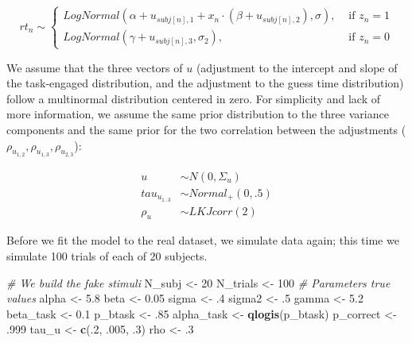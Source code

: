 \documentclass[12pt,]{krantz}
\newenvironment{Shaded}{\begin{snugshade}}{\end{snugshade}}
\newcommand{\CommentTok}[1]{\textcolor[rgb]{0.56,0.35,0.01}{\textit{#1}}}
\newcommand{\DecValTok}[1]{\textcolor[rgb]{0.00,0.00,0.81}{#1}}
\newcommand{\FloatTok}[1]{\textcolor[rgb]{0.00,0.00,0.81}{#1}}
\newcommand{\KeywordTok}[1]{\textcolor[rgb]{0.13,0.29,0.53}{\textbf{#1}}}
\newcommand{\NormalTok}[1]{#1}
\newcommand{\StringTok}[1]{\textcolor[rgb]{0.31,0.60,0.02}{#1}}
\theoremstyle{definition}
\theoremstyle{definition}
\theoremstyle{definition}
\theoremstyle{remark}
\begin{document}
\begin{equation}
rt_n \sim 
\begin{cases}
LogNormal(\alpha + u_{subj[n],1} +  x_n \cdot  (\beta +  u_{subj[n], 2}), \sigma), & \text{ if } z_n =1 \\
LogNormal(\gamma + u_{subj[n], 3}, \sigma_2), & \text{ if } z_n=0
\end{cases}
\end{equation}

We assume that the three vectors of \(u\) (adjustment to the intercept and slope of the task-engaged distribution, and the adjustment to the guess time distribution) follow a multinormal distribution centered in zero. For simplicity and lack of more information, we assume the same prior distribution to the three variance components and the same prior for the two correlation between the adjustments (\(\rho_{u_{1,2}}, \rho_{u_{1,3}}, \rho_{u_{2,3}}\)):

\begin{equation}
\begin{aligned}
u &\sim N(0, \Sigma_u)\\
tau_{u_{1..3}} & \sim  Normal_+(0, .5)\\
\rho_u &\sim LKJcorr(2) 
\end{aligned}
\end{equation}

Before we fit the model to the real dataset, we simulate data again; this time we simulate 100 trials of each of 20 subjects.

\begin{Shaded}
\begin{Highlighting}[]
\CommentTok{# We build the fake stimuli}
\NormalTok{N_subj <-}\StringTok{ }\DecValTok{20}
\NormalTok{N_trials <-}\StringTok{ }\DecValTok{100}
\CommentTok{# Parameters true values}
\NormalTok{alpha <-}\StringTok{ }\FloatTok{5.8}
\NormalTok{beta <-}\StringTok{ }\FloatTok{0.05}
\NormalTok{sigma <-}\StringTok{ }\FloatTok{.4}
\NormalTok{sigma2 <-}\StringTok{ }\FloatTok{.5}
\NormalTok{gamma <-}\StringTok{ }\FloatTok{5.2}
\NormalTok{beta_task <-}\StringTok{ }\FloatTok{0.1}
\NormalTok{p_btask <-}\StringTok{ }\FloatTok{.85}
\NormalTok{alpha_task <-}\StringTok{ }\KeywordTok{qlogis}\NormalTok{(p_btask)}
\NormalTok{p_correct <-}\StringTok{ }\FloatTok{.999}
\NormalTok{tau_u <-}\StringTok{ }\KeywordTok{c}\NormalTok{(.}\DecValTok{2}\NormalTok{, }\FloatTok{.005}\NormalTok{, }\FloatTok{.3}\NormalTok{)}
\NormalTok{rho <-}\StringTok{ }\FloatTok{.3}
\end{Highlighting}
\end{Shaded}
\end{document}
